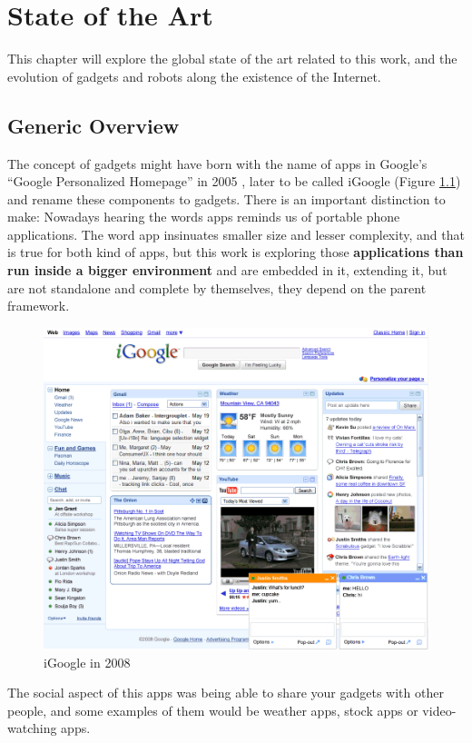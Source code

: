 \newpage
\thispagestyle{sectioned}
\chapter{State of the Art}
This chapter will explore the global state of the art related to this work, and the evolution of gadgets and robots along the existence of the Internet.
\section{Generic Overview}
The concept of gadgets might have born with the name of apps in Google's ``Google Personalized Homepage'' in 2005 \cite{ref:what_happened_to_igoogle}, later to be called iGoogle (Figure \ref{fig:igoogle_2008}) and rename these components to gadgets. There is an important distinction to make: Nowadays hearing the words apps reminds us of portable phone applications. The word app insinuates smaller size and lesser complexity, and that is true for both kind of apps, but this work is exploring those \textbf{applications than run inside a bigger environment} and are embedded in it, extending it, but are not standalone and complete by themselves, they depend on the parent framework.
\begin{figure}[h]
  \center
    \includegraphics[keepaspectratio, scale=0.6]{Media/Captures/Soa/iGoogle.png}
  \caption{iGoogle in 2008}
  \label{fig:igoogle_2008}
\end{figure}
The social aspect of this apps was being able to share your gadgets with other people, and some examples of them would be weather apps, stock apps or video-watching apps.\\[.2cm]

